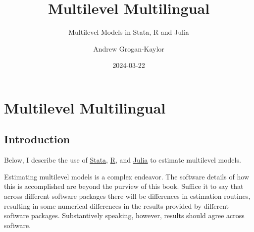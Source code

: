 \documentclass[
  letterpaper,
  DIV=11,
  numbers=noendperiod]{scrreprt}
\title{Multilevel Multilingual}
\subtitle{Multilevel Models in Stata, R and Julia}
\author{Andrew Grogan-Kaylor}
\date{2024-03-22}
\renewcommand*\contentsname{Table of contents}
\newcommand\contentsname{Table of contents}
\begin{document}
\maketitle

\renewcommand*\contentsname{Table of contents}
{
\hypersetup{linkcolor=}
\setcounter{tocdepth}{2}
\tableofcontents
}
\listoffigures
\listoftables
{}

\chapter{Multilevel Multilingual}\label{multilevel-multilingual}

\section{Introduction}\label{introduction}

Below, I describe the use of \href{https://www.stata.com/}{Stata},
\href{https://www.r-project.org/}{R}, and
\href{https://www.julialang.org/}{Julia} to estimate multilevel models.

\begin{tcolorbox}[enhanced jigsaw, coltitle=black, bottomtitle=1mm, leftrule=.75mm, colframe=quarto-callout-tip-color-frame, left=2mm, opacitybacktitle=0.6, colback=white, rightrule=.15mm, title=\textcolor{quarto-callout-tip-color}{\faLightbulb}\hspace{0.5em}{Results Will Vary Slightly}, breakable, opacityback=0, toprule=.15mm, toptitle=1mm, titlerule=0mm, arc=.35mm, bottomrule=.15mm, colbacktitle=quarto-callout-tip-color!10!white]

Estimating multilevel models is a complex endeavor. The software details
of how this is accomplished are beyond the purview of this book. Suffice
it to say that across different software packages there will be
differences in estimation routines, resulting in some numerical
differences in the results provided by different software packages.
Substantively speaking, however, results should agree across software.

\end{tcolorbox}
\end{document}

